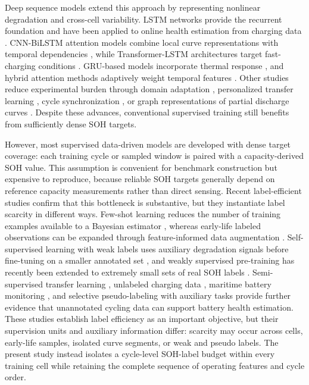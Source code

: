 \documentclass[pdflatex,sn-mathphys-num]{sn-jnl}
\begin{document}
Deep sequence models extend this approach by representing nonlinear degradation and cross-cell variability. LSTM networks provide the recurrent foundation \cite{hochreiter1997long} and have been applied to online health estimation from charging data \cite{liu2023online}. CNN-BiLSTM attention models combine local curve representations with temporal dependencies \cite{zhu2022attention}, while Transformer-LSTM architectures target fast-charging conditions \cite{fan2023online}. GRU-based models incorporate thermal response \cite{chen2022state}, and hybrid attention methods adaptively weight temporal features \cite{zhao2023state}. Other studies reduce experimental burden through domain adaptation \cite{lu2023deep}, personalized transfer learning \cite{ma2022real}, cycle synchronization \cite{zhou2022transfer}, or graph representations of partial discharge curves \cite{zhou2024graph}. Despite these advances, conventional supervised training still benefits from sufficiently dense SOH targets.

However, most supervised data-driven models are developed with dense target coverage: each training cycle or sampled window is paired with a capacity-derived SOH value. This assumption is convenient for benchmark construction but expensive to reproduce, because reliable SOH targets generally depend on reference capacity measurements rather than direct sensing. Recent label-efficient studies confirm that this bottleneck is substantive, but they instantiate label scarcity in different ways. Few-shot learning reduces the number of training examples available to a Bayesian estimator \cite{zhang2023fewshot}, whereas early-life labeled observations can be expanded through feature-informed data augmentation \cite{han2024limited}. Self-supervised learning with weak labels uses auxiliary degradation signals before fine-tuning on a smaller annotated set \cite{wang2024weaklabels}, and weakly supervised pre-training has recently been extended to extremely small sets of real SOH labels \cite{qian2026minimal}. Semi-supervised transfer learning \cite{li2020state}, unlabeled charging data \cite{lin2023improving}, maritime battery monitoring \cite{salucci2023novel}, and selective pseudo-labeling with auxiliary tasks \cite{li2026auxiliary} provide further evidence that unannotated cycling data can support battery health estimation. These studies establish label efficiency as an important objective, but their supervision units and auxiliary information differ: scarcity may occur across cells, early-life samples, isolated curve segments, or weak and pseudo labels. The present study instead isolates a cycle-level SOH-label budget within every training cell while retaining the complete sequence of operating features and cycle order.
\end{document}
